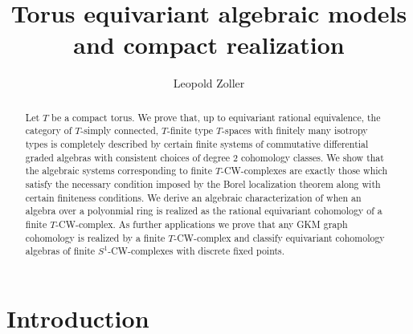 \documentclass[12pt,a4paper]{article}
\theoremstyle{definition}
\begin{document}
\title{Torus equivariant algebraic models and compact realization}
\author{Leopold Zoller}
\maketitle

\begin{abstract}
Let $T$ be a compact torus. We prove that, up to equivariant rational equivalence, the category of $T$-simply connected, $T$-finite type $T$-spaces with finitely many isotropy types is completely described by certain finite systems of commutative differential graded algebras with consistent choices of degree $2$ cohomology classes. We show that the algebraic systems corresponding to finite $T$-CW-complexes are exactly those which satisfy the necessary condition imposed by the Borel localization theorem along with certain finiteness conditions. We derive an algebraic characterization of when an algebra over a polyonmial ring is realized as the rational equivariant cohomology of a finite $T$-CW-complex. As further applications we prove that any GKM graph cohomology is realized by a finite $T$-CW-complex and classify equivariant cohomology algebras of finite $S^1$-CW-complexes with discrete fixed points.
\end{abstract}

\section{Introduction}
\end{document}
